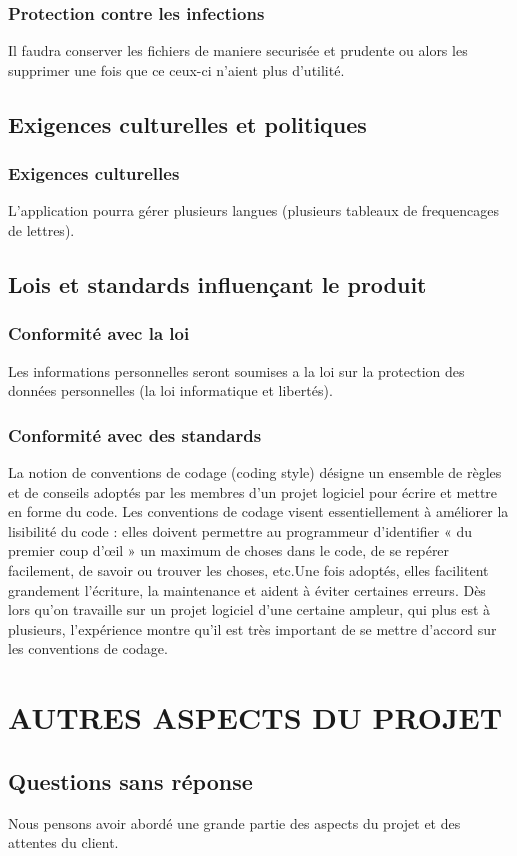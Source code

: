 \documentclass[a4]{article}
\begin{document}
			\subsubsection {Protection contre les infections}
				Il faudra conserver les fichiers de maniere securisée et prudente ou alors les supprimer une 					fois que ce ceux-ci n'aient plus d'utilité.
		\subsection{Exigences culturelles et politiques}
			\subsubsection {Exigences culturelles}
				L'application pourra gérer plusieurs langues (plusieurs tableaux de frequencages de lettres).
		\subsection{Lois et standards influençant le produit}
			\subsubsection {Conformité avec la loi}
				Les informations personnelles seront soumises a la loi sur la protection des données
				personnelles (la loi informatique et libertés).
			\subsubsection {Conformité avec des standards}
La notion de conventions de codage (coding style) désigne un ensemble de règles et de conseils 
adoptés par les membres d’un projet logiciel pour écrire et mettre en forme du code.
Les conventions de codage visent essentiellement à améliorer la lisibilité du code : elles doivent 
permettre au programmeur d’identifier « du premier coup d’œil » un maximum de choses dans 
le  code, de se repérer facilement, de savoir ou trouver les choses, etc.Une fois adoptés, elles
facilitent grandement l’écriture, la maintenance et aident à éviter certaines erreurs.
Dès lors qu’on travaille sur un projet logiciel d’une certaine ampleur, qui plus est à
plusieurs, l’expérience montre qu’il est très important de se mettre d’accord sur les
conventions de codage.	\section{AUTRES ASPECTS DU PROJET}
		\subsection{Questions sans réponse}
		Nous pensons avoir abordé une grande partie des aspects du projet et des attentes du client.
\end{document}
